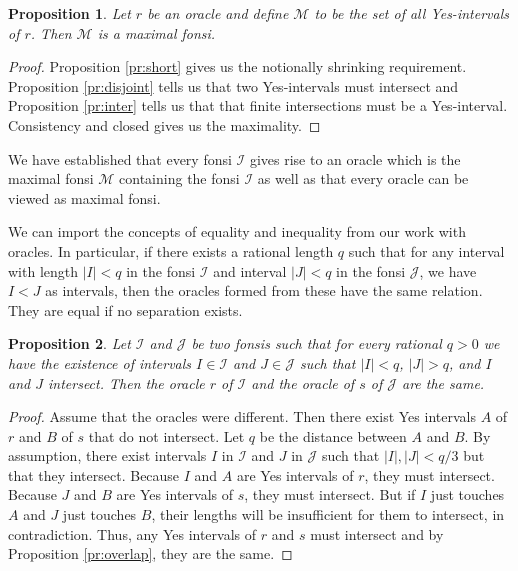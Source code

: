 \documentclass[12pt]{article}
\newtheorem{proposition}{Proposition}
\theoremstyle{remark}
\begin{document}
\begin{proposition} Let $r$ be an oracle and define $\mathcal{M}$ to be the set of all Yes-intervals of $r$. Then $\mathcal{M}$ is a maximal fonsi. 
\end{proposition}

\begin{proof}
     Proposition \ref{pr:short} gives us the notionally shrinking requirement. Proposition \ref{pr:disjoint} tells us that two Yes-intervals must intersect and Proposition \ref{pr:inter} tells us that that finite intersections must be a Yes-interval. Consistency and closed gives us the maximality.
\end{proof}

We have established that every fonsi $\mathcal{I}$ gives rise to an oracle which is the maximal fonsi $\mathcal{M}$ containing the fonsi $\mathcal{I}$ as well as that every oracle can be viewed as maximal fonsi.

We can import the concepts of equality and inequality from our work with oracles. In particular, if there exists a rational length $q$ such that for any interval with length $|I|<q$ in the fonsi $\mathcal{I}$ and interval $|J|<q$ in the fonsi $\mathcal{J}$, we have $I  < J$ as intervals, then the oracles formed from these have the same relation. They are equal if no separation exists. 

\begin{proposition}\label{pr:fonsi-inter}
Let $\mathcal{I}$ and $\mathcal{J}$ be two fonsis such that for every rational $q>0$ we have the existence of intervals $I \in \mathcal{I}$ and $J \in \mathcal{J}$ such that $|I| <q$, $|J|>q$, and $I$ and $J$ intersect. Then the oracle $r$ of $\mathcal{I}$ and the oracle of $s$ of $\mathcal{J}$ are the same. 
\end{proposition}

\begin{proof}
Assume that the oracles were different. Then there exist Yes intervals $A$ of $r$ and $B$ of $s$ that do not intersect. Let $q$ be the distance between $A$ and $B$. By assumption, there exist intervals $I$ in $\mathcal{I}$ and $J$ in $\mathcal{J}$ such that $|I|, |J| < q/3$ but that they intersect. Because $I$ and $A$ are Yes intervals of $r$, they must intersect. Because $J$ and $B$ are Yes intervals of $s$, they must intersect. But if $I$ just touches $A$ and $J$ just touches $B$, their lengths will be insufficient for them to intersect, in contradiction. Thus, any Yes intervals of $r$ and $s$ must intersect and by Proposition \ref{pr:overlap}, they are the same.  
\end{proof}
\end{document}
